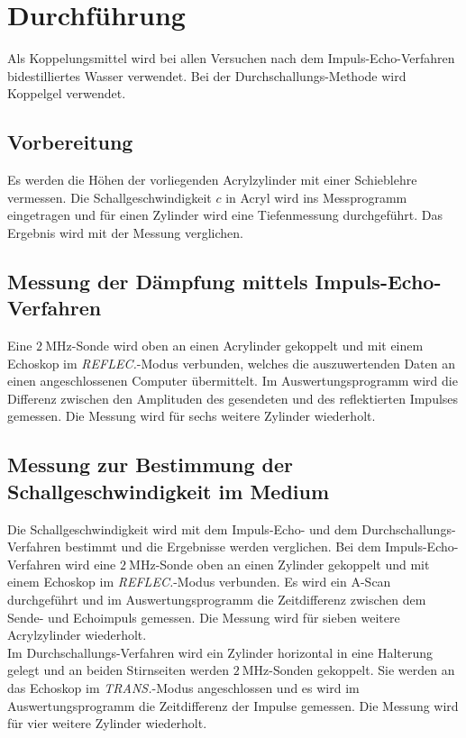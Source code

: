 \section{Durchführung}
\label{sec:Durchführung}

Als Koppelungsmittel wird bei allen Versuchen nach dem Impuls-Echo-Verfahren bidestilliertes Wasser verwendet. Bei der Durchschallungs-Methode wird Koppelgel verwendet.

\subsection{Vorbereitung}
Es werden die Höhen der vorliegenden Acrylzylinder mit einer Schieblehre vermessen. Die Schallgeschwindigkeit $c$ in Acryl wird ins Messprogramm eingetragen und für einen Zylinder wird eine Tiefenmessung durchgeführt. Das Ergebnis wird mit der Messung verglichen.

\subsection{Messung der Dämpfung mittels Impuls-Echo-Verfahren}
Eine $\SI{2}{\mega\hertz}$-Sonde wird oben an einen Acrylinder gekoppelt und mit einem Echoskop im \textit{REFLEC.}-Modus verbunden, welches die auszuwertenden Daten an einen angeschlossenen Computer übermittelt.
Im Auswertungsprogramm wird die Differenz zwischen den Amplituden des gesendeten und des reflektierten Impulses gemessen. 
Die Messung wird für sechs weitere Zylinder wiederholt.

\subsection{Messung zur Bestimmung der Schallgeschwindigkeit im Medium}
Die Schallgeschwindigkeit wird mit dem Impuls-Echo- und dem Durchschallungs-Verfahren bestimmt und die Ergebnisse werden verglichen.
Bei dem Impuls-Echo-Verfahren wird eine $\SI{2}{\mega\hertz}$-Sonde oben an einen Zylinder gekoppelt und mit einem Echoskop im \textit{REFLEC.}-Modus verbunden.
Es wird ein A-Scan durchgeführt und im Auswertungsprogramm die Zeitdifferenz zwischen dem Sende- und Echoimpuls gemessen. Die Messung wird für sieben weitere Acrylzylinder wiederholt.\\
Im Durchschallungs-Verfahren wird ein Zylinder horizontal in eine Halterung gelegt und an beiden Stirnseiten werden $\SI{2}{\mega\hertz}$-Sonden gekoppelt. Sie werden an das Echoskop im \textit{TRANS.}-Modus angeschlossen und es wird im Auswertungsprogramm die Zeitdifferenz der Impulse gemessen.
Die Messung wird für vier weitere Zylinder wiederholt.

